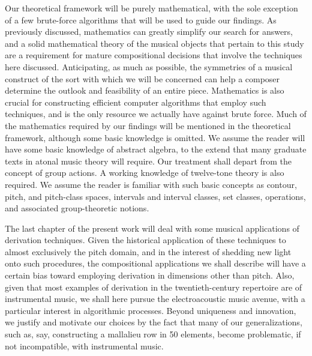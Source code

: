 Our theoretical framework will be purely mathematical, with the sole exception of a few brute-force algorithms that will be used to guide our findings. As previously discussed, mathematics can greatly simplify our search for answers, and a solid mathematical theory of the musical objects that pertain to this study are a requirement for mature compositional decisions that involve the techniques here discussed. Anticipating, as much as possible, the symmetries of a musical construct of the sort with which we will be concerned can help a composer determine the outlook and feasibility of an entire piece. Mathematics is also crucial for constructing efficient computer algorithms that employ such techniques, and is the only resource we actually have against brute force. Much of the mathematics required by our findings will be mentioned in the theoretical framework, although some basic knowledge is omitted. We assume the reader will have some basic knowledge of abstract algebra, to the extend that many graduate texts in atonal music theory will require. Our treatment shall depart from the concept of group actions. A working knowledge of twelve-tone theory is also required. We assume the reader is familiar with such basic concepts as contour, pitch, and pitch-class spaces, intervals and interval classes, set classes, operations, and associated group-theoretic notions.

The last chapter of the present work will deal with some musical applications of derivation techniques. Given the historical application of these techniques to almost exclusively the pitch domain, and in the interest of shedding new light onto such procedures, the compositional applications we shall describe will have a certain bias toward employing derivation in dimensions other than pitch. Also, given that most examples of derivation in the twentieth-century repertoire are of instrumental music, we shall here pursue the electroacoustic music avenue, with a particular interest in algorithmic processes. Beyond uniqueness and innovation, we justify and motivate our choices by the fact that many of our generalizations, such as, say, constructing a mallalieu row in 50 elements, become problematic, if not incompatible, with instrumental music.
